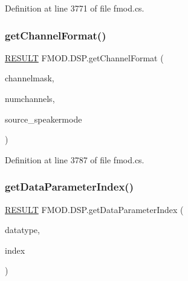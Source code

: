 Definition at line 3771 of file fmod.\+cs.

\mbox{\label{class_f_m_o_d_1_1_d_s_p_afcba15be09b480630d20aa4312918723}} 
\subsubsection{\texorpdfstring{get\+Channel\+Format()}{getChannelFormat()}}
{\footnotesize\ttfamily \hyperlink{namespace_f_m_o_d_a305d1176ef3f8c8815861a60407ac33d}{R\+E\+S\+U\+LT} F\+M\+O\+D.\+D\+S\+P.\+get\+Channel\+Format (\begin{DoxyParamCaption}\item[{out \hyperlink{namespace_f_m_o_d_ae295945ff00acb5f2e5ef0b3f217f5e2}{C\+H\+A\+N\+N\+E\+L\+M\+A\+SK}}]{channelmask,  }\item[{out int}]{numchannels,  }\item[{out \hyperlink{namespace_f_m_o_d_aa0732e7e8efd3b96b526a7f2f8479634}{S\+P\+E\+A\+K\+E\+R\+M\+O\+DE}}]{source\+\_\+speakermode }\end{DoxyParamCaption})}



Definition at line 3787 of file fmod.\+cs.

\mbox{\label{class_f_m_o_d_1_1_d_s_p_ab68360d5ad1f662b6af4b5d8e5caf80d}} 
\subsubsection{\texorpdfstring{get\+Data\+Parameter\+Index()}{getDataParameterIndex()}}
{\footnotesize\ttfamily \hyperlink{namespace_f_m_o_d_a305d1176ef3f8c8815861a60407ac33d}{R\+E\+S\+U\+LT} F\+M\+O\+D.\+D\+S\+P.\+get\+Data\+Parameter\+Index (\begin{DoxyParamCaption}\item[{int}]{datatype,  }\item[{out int}]{index }\end{DoxyParamCaption})}



